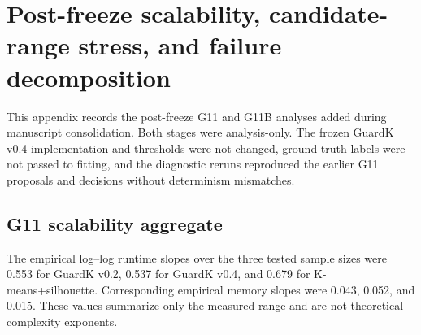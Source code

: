 \section{Post-freeze scalability, candidate-range stress, and failure decomposition}
\label{app:g11}

This appendix records the post-freeze G11 and G11B analyses added during manuscript consolidation. Both stages were analysis-only. The frozen GuardK v0.4 implementation and thresholds were not changed, ground-truth labels were not passed to fitting, and the diagnostic reruns reproduced the earlier G11 proposals and decisions without determinism mismatches.

\subsection{G11 scalability aggregate}
\begin{table}[H]
\centering
\caption{Full G11 scalability aggregate (three seeds per row).}
\scriptsize
{}
\end{table}

The empirical log--log runtime slopes over the three tested sample sizes were 0.553 for GuardK v0.2, 0.537 for GuardK v0.4, and 0.679 for K-means+silhouette. Corresponding empirical memory slopes were 0.043, 0.052, and 0.015. These values summarize only the measured range and are not theoretical complexity exponents.

